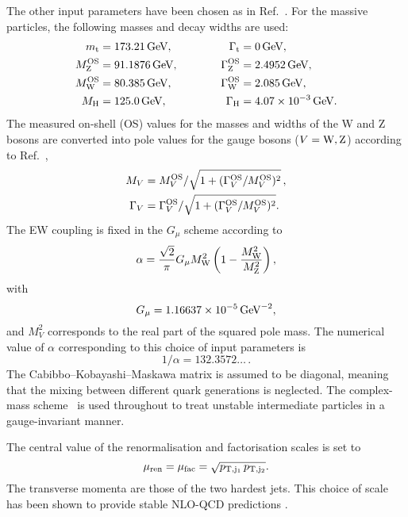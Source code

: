 \documentclass[11pt,epsf]{article}
\begin{document}
 The other input parameters have been chosen as in Ref.~\cite{Ballestrero:2018anz}.
    For the massive particles, the following masses and decay widths are used:
    \begin{alignat}{2}
                      m_\text{t}   &=  173.21\,\text{GeV},       & \quad \quad \quad \Gamma_\text{t} &= 0 \,\text{GeV},  \nonumber \\
                    M_\text{Z}^\text{OS} &=  91.1876\,\text{GeV},      & \quad \quad \quad \Gamma_\text{Z}^\text{OS} &= 2.4952\,\text{GeV},  \nonumber \\
                    M_\text{W}^\text{OS} &=  80.385\,\text{GeV},       & \Gamma_\text{W}^\text{OS} &= 2.085\,\text{GeV},  \nonumber \\
                    M_{\rm H} &=  125.0\,\text{GeV},       &  \Gamma_\text{H}   &=  4.07 \times 10^{-3}\,\text{GeV}.
    \end{alignat}
    The measured on-shell (OS) values for the masses and widths of the W and Z bosons are converted into pole values for the gauge bosons ($V=\text{W},\text{Z}$) according to Ref.~\cite{Bardin:1988xt},
    \begin{equation}
    \begin{split}
            M_V &= M_{V}^\text{OS}/\sqrt{1+(\Gamma_{V}^\text{OS}/M_{V}^\text{OS})^2}\,, \\
       \Gamma_V &= \Gamma_{V}^\text{OS}/\sqrt{1+(\Gamma_{V}^\text{OS}/M_{V}^\text{OS})^2}.
    \end{split}
    \end{equation}
    The EW coupling is fixed in the $G_\mu$ scheme \cite{Denner:2000bj} according to 
    \begin{equation}
    \alpha =  \frac{\sqrt{2}}{\pi} G_{\mu} M_{\rm W}^2 \left(1-\frac{M_{\rm W}^2}{M_{\rm Z}^2} \right),
    \end{equation}
    with
    \begin{equation}
        G_{\mu}    = 1.16637\times 10^{-5}\,\text{GeV}^{-2},
    \end{equation}
    and $M_V^2$ corresponds to the real part of the squared pole mass.
    The numerical value of $\alpha$ corresponding to this choice of input parameters is
    \begin{equation}
     1/\alpha = 132.3572\ldots\,.
    \end{equation}
    The Cabibbo--Kobayashi--Maskawa matrix is assumed to be diagonal, meaning that the mixing between different quark generations is neglected.
    The complex-mass scheme~\cite{Denner:1999gp,Denner:2005fg,Denner:2006ic} is used throughout to treat unstable intermediate particles in a gauge-invariant manner.

    The central value of the renormalisation and factorisation scales is set to 
    \begin{equation}
    \label{eq:defscale}
     \mu_{\rm ren} = \mu_{\rm fac} = \sqrt{p_{\rm T, j_1}\, p_{\rm T, j_2}} .
    \end{equation}
    The transverse momenta are those of the two hardest jets.
    This choice of scale has been shown to provide stable NLO-QCD predictions \cite{Denner:2012dz}.
\end{document}
